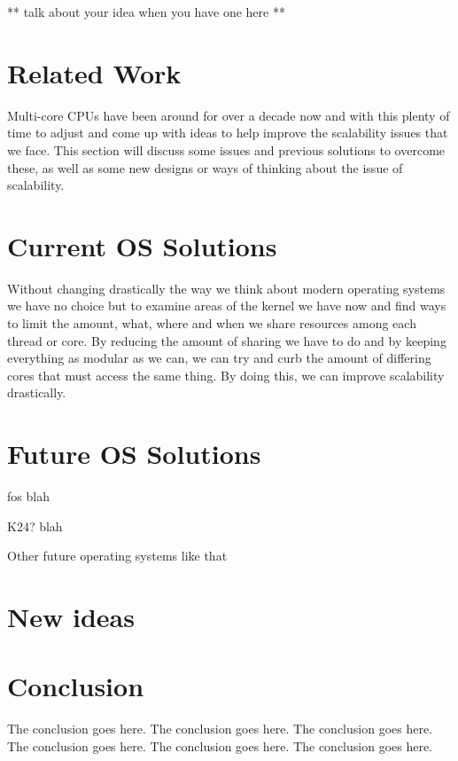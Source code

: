 \documentclass[journal]{IEEEtran}
\begin{document}
** talk about your idea when you have one here **

\section{Related Work}

Multi-core CPUs have been around for over a decade now and with this plenty of time to adjust and come up with ideas to help improve the scalability issues that we face. This section will discuss some issues and previous solutions to overcome these, as well as some new designs or ways of thinking about the issue of scalability. 

\section{Current OS Solutions}

Without changing drastically the way we think about modern operating systems we have no choice but to examine areas of the kernel we have now and find ways to limit the amount, what, where and when we share resources among each thread or core. By reducing the amount of sharing we have to do and by keeping everything as modular as we can, we can try and curb the amount of differing cores that must access the same thing. By doing this, we can improve scalability drastically. 



\section{Future OS Solutions}

fos blah

K24? blah

Other future operating systems like that

\section{New ideas}

\section{Conclusion}
The conclusion goes here.
The conclusion goes here.
The conclusion goes here.
The conclusion goes here.
The conclusion goes here.
The conclusion goes here.




\end{document}
